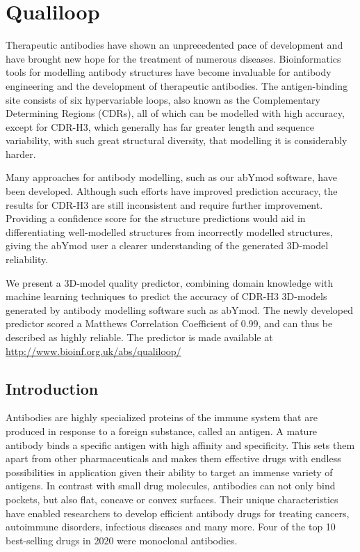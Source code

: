 
\chapter{Qualiloop}
\label{chapterlabel2}
  Therapeutic antibodies have shown an unprecedented pace of
  development and have brought new hope for the treatment of numerous
  diseases. Bioinformatics tools for modelling antibody structures
  have become invaluable for antibody engineering and the development
  of therapeutic antibodies. The antigen-binding site consists of six
  hypervariable loops, also known as the Complementary Determining
  Regions (CDRs), all of which can be modelled with high accuracy,
  except for CDR-H3, which generally has
  far greater length and sequence variability, with such great structural
  diversity, that modelling it is considerably harder.

  Many approaches for antibody modelling, such as our
  abYmod software, have been developed. Although such efforts have
  improved prediction accuracy, the results for CDR-H3 are
  still inconsistent and require further improvement. Providing a
  confidence score for the structure predictions would aid in
  differentiating well-modelled structures from incorrectly modelled
  structures, giving the abYmod user a clearer understanding of the
  generated 3D-model reliability.

  We present a 3D-model quality predictor, combining domain knowledge
  with machine learning techniques to predict the accuracy of CDR-H3
  3D-models generated by antibody modelling software such as abYmod. The
  newly developed predictor scored a Matthews Correlation Coefficient
  of 0.99, and can thus be described as highly reliable. The predictor
  is made available at \url{http://www.bioinf.org.uk/abs/qualiloop/}

\section{Introduction}

Antibodies are highly specialized proteins of the immune system that
are produced in response to a foreign substance, called an antigen. A
mature antibody binds a specific antigen with high affinity and specificity. This sets them apart from other pharmaceuticals and makes them effective drugs with endless possibilities in application given their ability to target an immense variety of antigens.
In contrast with small drug molecules, antibodies can not
only bind pockets, but also flat, concave or convex
surfaces\cite{MacCallum1996}. Their unique characteristics have enabled 
researchers to develop efficient antibody drugs for treating cancers,
autoimmune disorders, infectious diseases and many more\cite{Lu2020}.
Four of the top 10 best-selling drugs in
2020 were monoclonal antibodies\cite{Urquhart2021}.

